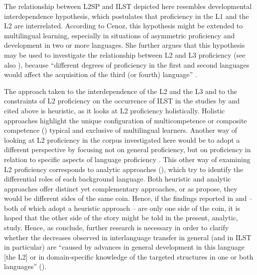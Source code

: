 \documentclass[output=paper,modfonts,nonflat, newtxmath]{langsci/langscibook}
\begin{document}
The relationship between L2SP and ILST depicted here resembles  {developmental} {interdependence} hypothesis, which postulates that proficiency in the L1 and the L2 are interrelated. According to Cenoz, this hypothesis might be extended to multilingual learning, especially in situations of asymmetric proficiency and development in two or more languages. She further argues that this hypothesis may be used to investigate the relationship between L2 and L3 proficiency (see also \citealt{Abunuwara1992, Chumbow1981, Thomas1988}), because “different degrees of proficiency in the first and second languages would affect the acquisition of the third (or fourth) language” \citep[46]{Cenoz2000}.

The approach taken to the interdependence of the L2 and the L3 and to the constraints of L2 proficiency on the occurrence of ILST in the studies by \citet{Sánchez2011} and \citet{SánchezBardel2017} cited above is heuristic, as it looks at L2 proficiency holistically. Holistic approaches highlight the unique configuration of multicompetence \citep{Cook1992} or composite competence (\citealt[60]{CouncilofEurope2001}) typical and exclusive of multilingual learners. Another way of looking at L2 proficiency in the corpus investigated here would be to adopt a different perspective by focusing not on general proficiency, but on proficiency in relation to specific aspects of language proficiency \citep{North1997}. This other way of examining L2 proficiency corresponds to analytic approaches (\citealt{HerdinaJessner2002, Stratilaki2006}), which try to identify the differential roles of each background language. Both heuristic and analytic approaches offer distinct yet complementary approaches, or as \citet[242]{SánchezBardel2017} propose, they would be different sides of the same coin. Hence, if the findings reported in \citet{Sánchez2011} and \citet{SánchezBardel2017} – both of which adopt a heuristic approach – are only one side of the coin, it is hoped that the other side of the story might be told in the present, analytic, study. Hence, as \citet{SánchezBardel2017} conclude, further research is necessary in order to clarify whether the decreases observed in interlanguage transfer in general (and in ILST in particular) are “caused by advances in general development in this language [the L2] or in domain-specific knowledge of the targeted structures in one or both languages” (\citealt[244]{SánchezBardel2017}).
\end{document}
